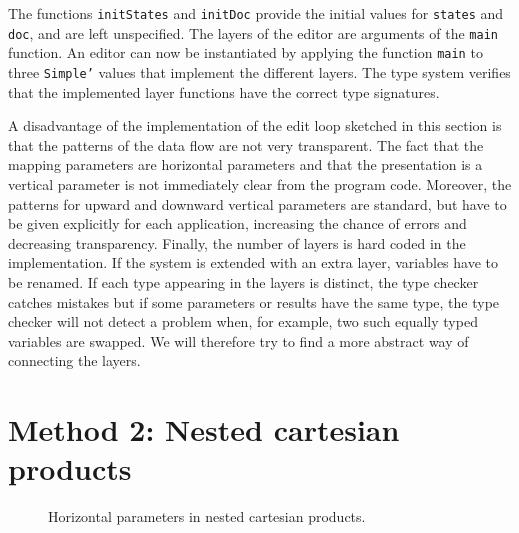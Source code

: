 \par The functions \texttt{initStates} and \texttt{initDoc} provide the
      initial values for \texttt{states} and \texttt{doc}, and are left unspecified.
      The layers of the editor are arguments of the \texttt{main} function. An editor
      can now be instantiated by applying the function \texttt{main} to three
      \texttt{Simple'} values that implement the different layers. The type system
      verifies that the implemented layer functions have the correct type
      signatures.
\par A disadvantage of the implementation of the edit loop sketched in this
      section is that the patterns of the data flow are not very transparent. The
      fact that the mapping parameters are horizontal parameters and that the
      presentation is a vertical parameter is not immediately clear from the program
      code. Moreover, the patterns for upward and downward vertical parameters are
      standard, but have to be given explicitly for each application, increasing the
      chance of errors and decreasing transparency. Finally, the number of layers is
      hard coded in the implementation. If the system is extended with an extra
      layer, variables have to be renamed. If each type appearing in the layers is
      distinct, the type checker catches mistakes but if some parameters or results
      have the same type, the type checker will not detect a problem when, for
      example, two such equally typed variables are swapped. We will therefore try to
      find a more abstract way of connecting the layers.
\section{Method 2: Nested cartesian products}
\label{sectncp}
\begin{figure}
\begin{small}
\begin{center}
\begin{center}
\begin{scriptsize}
\bigskip \noindent
{}
\end{scriptsize}
\end{center}\caption{ Horizontal parameters in nested cartesian
    products.}\label{ncp} 
\end{center}
\end{small}
\end{figure}

